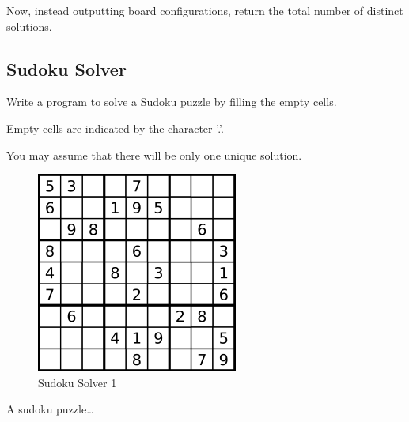 \documentclass[12pt]{book}
\begin{document}
Now, instead outputting board configurations, return the total number of distinct solutions.
\subsection{Sudoku Solver}
\label{sec-11-2-3}
Write a program to solve a Sudoku puzzle by filling the empty cells.

Empty cells are indicated by the character '.'.

You may assume that there will be only one unique solution.

\begin{figure}[htb]
\centering
\includegraphics[width=.9\linewidth]{./pic/solveSudoku1.png}
\caption{Sudoku Solver 1}
\end{figure}

A sudoku puzzle\ldots{}
\end{document}
